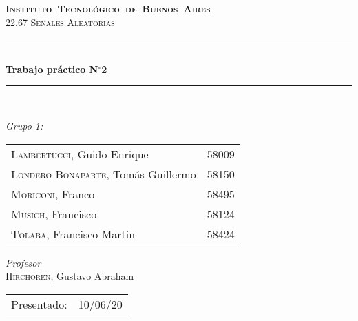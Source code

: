 \begin{titlepage}
\newcommand{\HRule}{\rule{\linewidth}{0.5mm}}
\center
\mbox{\textsc{\LARGE \bfseries {Instituto Tecnológico de Buenos Aires}}}\\[1.5cm]
\textsc{\Large 22.67 Señales Aleatorias}\\[0.5cm]


\HRule \\[0.6cm]
{ \Huge \bfseries Trabajo práctico N$^{\circ}$2}\\[0.4cm] 
\HRule \\[1.5cm]


{\large

\emph{Grupo 1:}\\
\vspace{3px}

\begin{tabular}{lr} 	
\textsc{Lambertucci}, Guido Enrique  & 58009 \\
\textsc{Londero Bonaparte}, Tomás Guillermo  & 58150 \\
\textsc{Moriconi}, Franco  &  58495\\
\textsc{Musich}, Francisco  & 58124\\
\textsc{Tolaba}, Francisco Martin & 58424\\
\end{tabular}

\vspace{20px}

\emph{Profesor}\\
\textsc{Hirchoren}, Gustavo Abraham \\
\vspace{3px}

\vspace{100px}

\begin{tabular}{ll}

Presentado: & 10/06/20\\

\end{tabular}

}

\vfill

\end{titlepage}
